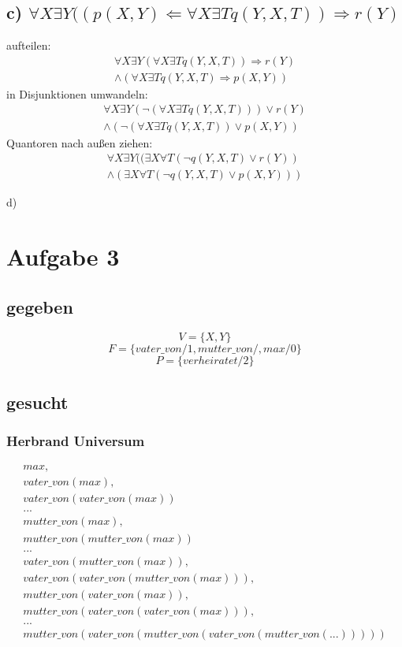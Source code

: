 \documentclass[10pt,a4paper]{article}
\begin{document}
	\subsection*{c) $\forall X \exists Y((p(X, Y)\Leftarrow \forall X \exists T q(Y, X, T))\Rightarrow r(Y)$} 
	aufteilen:
	\begin{gather*}
		\forall X \exists Y(\forall X \exists T q(Y, X, T))\Rightarrow r(Y) \\ 
		\wedge 
		(\forall X \exists T q(Y, X, T) \Rightarrow p(X, Y))
	\end{gather*}
	in Disjunktionen umwandeln:
	\begin{gather*}
		\forall X \exists Y(\neg(\forall X \exists T q(Y, X, T))) \vee r(Y) \\ 
		\wedge 
		(\neg(\forall X \exists T q(Y, X, T))\vee p(X, Y))
	\end{gather*}	
	Quantoren nach außen ziehen:
	\begin{gather*}
		\forall X \exists Y((\exists X \forall T (\neg q(Y, X, T) \vee r(Y)) \\ 
		\wedge 
		(\exists X \forall T (\neg q(Y, X, T)\vee p(X, Y)))
	\end{gather*}	
	
	d)
	
\section*{Aufgabe 3}

\subsection*{gegeben}
$$V=\{X,Y\}$$
$$F=\{vater\_von/1, mutter\_von/, max/0\}$$
$$P=\{verheiratet/2\}$$

\subsection*{gesucht}
\subsubsection*{Herbrand Universum}
\begin{align*}
max, \\ vater\_von(max), \\ vater\_von(vater\_von(max)) \\ ...\\
mutter\_von(max), \\ mutter\_von(mutter\_von(max)) \\ ... \\
vater\_von(mutter\_von(max)), \\
vater\_von(vater\_von(mutter\_von(max))), \\
mutter\_von(vater\_von(max)), \\
mutter\_von(vater\_von(vater\_von(max))), \\
... \\
mutter\_von(vater\_von(mutter\_von(vater\_von(mutter\_von(...)))))
\end{align*}
\end{document}
